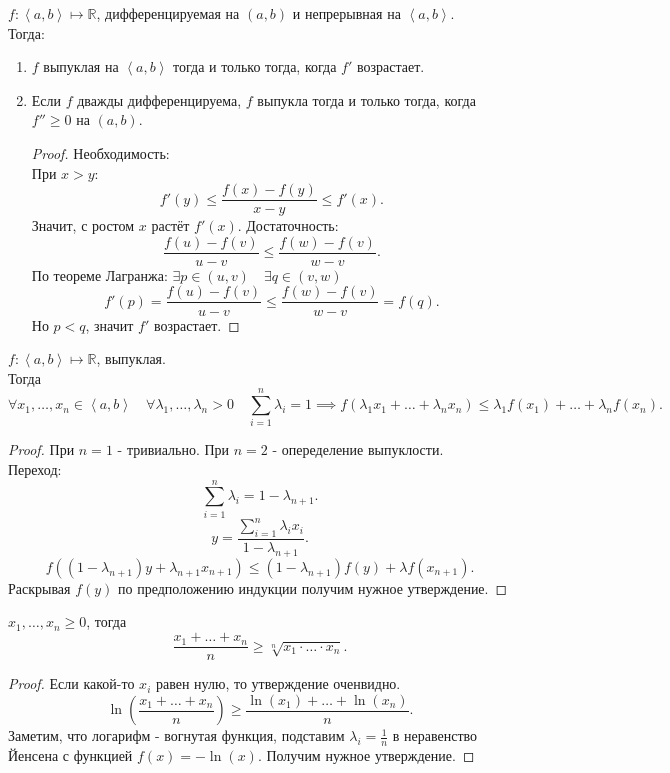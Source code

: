 \documentclass[11pt, oneside]{article}   	%
\begin{document}
\begin{theorem}
    $f : \left<a, b\right> \mapsto \mathbb{R}$, дифференцируемая на $\left( a, b \right) $ и непрерывная на $\left<a, b\right>$.\\
    Тогда:
    \begin{enumerate}
        \item $f$ выпуклая на $\left<a, b\right>$ тогда и только тогда, когда $f'$ возрастает.
        \item Если $f$ дважды дифференцируема, $f$ выпукла тогда и только тогда, когда $f'' \ge 0$ на $\left( a, b \right)$.
        \begin{proof}
            Необходимость:\\
            При $x>y$:
            \[ f'(y) \le \frac{f(x)-f(y)}{x-y} \le f'(x) .\]
            Значит, с ростом $x$ растёт $f'(x)$.
            Достаточность:
            \[ \frac{f(u)-f(v)}{u-v} \le \frac{f(w)-f(v)}{w-v} .\]
            По теореме Лагранжа: $\exists{p\in (u, v)}\quad \exists{q\in (v, w)}\quad $
            \[ f'(p) = \frac{f(u)-f(v)}{u-v} \le \frac{f(w)-f(v)}{w-v} = f(q) .\]
            Но $p<q$, значит $f'$ возрастает. 
        \end{proof}
    \end{enumerate}
\end{theorem}
\begin{theorem}
    $f : \left<a, b\right> \mapsto \mathbb{R}$, выпуклая.\\
    Тогда
    \[ \forall{x_1, \ldots, x_n\in \left<a, b\right>}\quad \forall{\lambda_1, \ldots, \lambda_n >0}\quad \sum\limits_{i=1}^{n}\lambda_i = 1 \implies f(\lambda_1x_1 + \ldots + \lambda_nx_n) \le \lambda_1 f(x_1) + \ldots + \lambda_{n}f(x_n) .\]
    \begin{proof}
        При $n=1$ - тривиально.
        При $n=2$ - опеределение выпуклости.\\
        Переход:
        \[ \sum\limits_{i=1}^{n}\lambda_{i} = 1 - \lambda_{n+1} .\]
        \[ y = \frac{\sum\limits_{i=1}^{n}\lambda_i x_i}{1-\lambda_{n+1}} .\] 
        \[ f((1-\lambda_{n+1})y+\lambda_{n+1}x_{n+1}) \le (1-\lambda_{n+1})f(y) + \lambda f(x_{n+1}).\]
        Раскрывая $f(y)$ по предположению индукции получим нужное утверждение.
    \end{proof}
\end{theorem}
\begin{theorem}
    $x_1, \ldots, x_n \ge 0$, тогда
    \[ \frac{x_1 + \ldots + x_{n}}{n} \ge \sqrt[n]{x_1 \cdot \ldots \cdot  x_n}  .\]
    \begin{proof}
        Если какой-то $x_i$ равен нулю, то утверждение оченвидно.\\
        \[ \ln \left( \frac{x_1 + \ldots + x_n}{n} \right) \ge \frac{\ln(x_1) + \ldots + \ln(x_n)}{n}  .\]
        Заметим, что логарифм - вогнутая функция, подставим $\lambda_i = \frac{1}{n}$ в неравенство Йенсена с функцией $f(x) = -\ln(x)$. Получим нужное утверждение.
    \end{proof}
\end{theorem}
\end{document}
